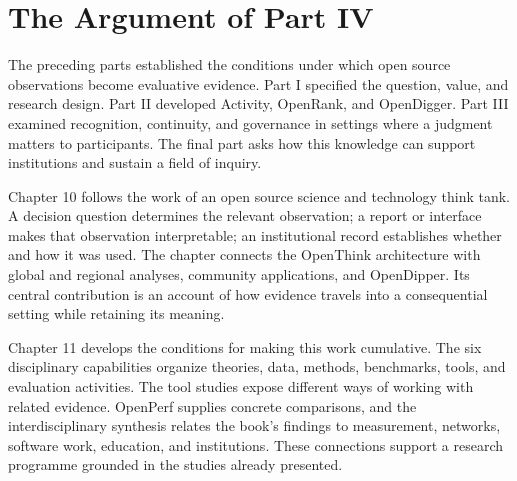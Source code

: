 \chapter*{The Argument of Part IV}
\label{part4:guide}
\noindent The preceding parts established the conditions under which open source observations become evaluative evidence. Part I specified the question, value, and research design. Part II developed Activity, OpenRank, and OpenDigger. Part III examined recognition, continuity, and governance in settings where a judgment matters to participants. The final part asks how this knowledge can support institutions and sustain a field of inquiry.

Chapter 10 follows the work of an open source science and technology think tank. A decision question determines the relevant observation; a report or interface makes that observation interpretable; an institutional record establishes whether and how it was used. The chapter connects the OpenThink architecture with global and regional analyses, community applications, and OpenDipper. Its central contribution is an account of how evidence travels into a consequential setting while retaining its meaning.

Chapter 11 develops the conditions for making this work cumulative. The six disciplinary capabilities organize theories, data, methods, benchmarks, tools, and evaluation activities. The tool studies expose different ways of working with related evidence. OpenPerf supplies concrete comparisons, and the interdisciplinary synthesis relates the book's findings to measurement, networks, software work, education, and institutions. These connections support a research programme grounded in the studies already presented.

